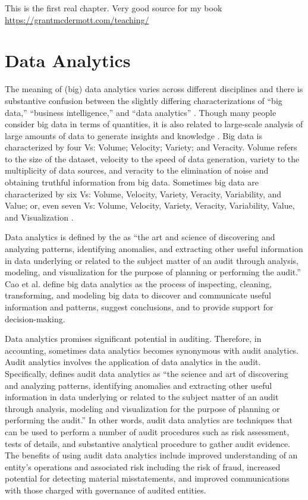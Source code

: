 \documentclass[
]{book}
\begin{document}
This is the first real chapter. Very good source for my book \url{https://grantmcdermott.com/teaching/}

\hypertarget{data-analytics}{%
\section{Data Analytics}\label{data-analytics}}

The meaning of (big) data analytics varies across different disciplines and there is substantive confusion between the slightly differing characterizations of ``big data,'' ``business intelligence,'' and ``data analytics'' \citep{vasarhelyi_big_2015}. Though many people consider big data in terms of quantities, it is also related to large-scale analysis of large amounts of data to generate insights and knowledge \citep{verver_six_2015}. Big data is characterized by four Vs: Volume; Velocity; Variety; and Veracity. Volume refers to the size of the dataset, velocity to the speed of data generation, variety to the multiplicity of data sources, and veracity to the elimination of noise and obtaining truthful information from big data. Sometimes big data are characterized by six Vs: Volume, Velocity, Variety, Veracity, Variability, and Value; or, even seven Vs: Volume, Velocity, Variety, Veracity, Variability, Value, and Visualization \citep{sivarajah_critical_2017}.

Data analytics is defined by the \citet[p.~105]{american_institute_of_certified_public_accountants_aicpa_audit_2015} as ``the art and science of discovering and analyzing patterns, identifying anomalies, and extracting other useful information in data underlying or related to the subject matter of an audit through analysis, modeling, and visualization for the purpose of planning or performing the audit.'' Cao et al. \citeyearpar{cao_big_2015} define big data analytics as the process of inspecting, cleaning, transforming, and modeling big data to discover and communicate useful information and patterns, suggest conclusions, and to provide support for decision-making.

Data analytics promises significant potential in auditing. Therefore, in accounting, sometimes data analytics becomes synonymous with audit analytics. Audit analytics involves the application of data analytics in the audit. Specifically, \citet{american_institute_of_certified_public_accountants_aicpa_description_2017} defines audit data analytics as ``the science and art of discovering and analyzing patterns, identifying anomalies and extracting other useful information in data underlying or related to the subject matter of an audit through analysis, modeling and visualization for the purpose of planning or performing the audit.'' In other words, audit data analytics are techniques that can be used to perform a number of audit procedures such as risk assessment, tests of details, and substantive analytical procedure to gather audit evidence. The benefits of using audit data analytics include improved understanding of an entity's operations and associated risk including the risk of fraud, increased potential for detecting material misstatements, and improved communications with those charged with governance of audited entities.
\end{document}
